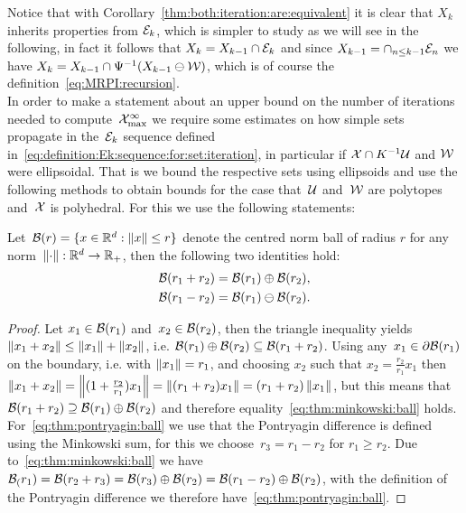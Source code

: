 %
\noindent Notice that with Corollary~\ref{thm:both:iteration:are:equivalent} it is clear that $X_k$ inherits properties from $\mathcal E_k$, which is simpler to study as we will see in the following, in fact it follows that $X_k = X_{k-1}\cap\mathcal E_k$ and since $X_{k-1} = \cap_{n\leq k-1}\mathcal E_n$ we have $X_k = X_{k-1}\cap\Psi^{-1}(X_{k-1}\ominus\mathcal W)$, which is of course the definition~\eqref{eq:MRPI:recursion}.
%
\\[1em]
%
\mysplit In order to make a statement about an upper bound on the number of iterations needed to compute~$\mathcal X_{\max}^\infty$ we require some estimates on how simple sets propagate in the~$\mathcal E_k$ sequence defined in~\eqref{eq:definition:Ek:sequence:for:set:iteration}, in particular if $\mathcal X\cap K^{-1}\mathcal U$ and $\mathcal W$ were ellipsoidal.
%
That is we bound the respective sets using ellipsoids and use the following methods to obtain bounds for the case that~$\mathcal U$ and~$\mathcal W$ are polytopes and~$\mathcal X$ is polyhedral.
%
For this we use the following statements:
%
\begin{cor}\label{thm:identities:norm:balls}
Let~$\mathcal B(r)=\{x\in\mathbb R^d:\left\|x\right\|\leq r\}$ denote the centred norm ball of radius $r$ for any norm~$\left\|\cdot\right\|:\mathbb R^d\rightarrow\mathbb R_+$, then the following two identities hold:
%
\begin{align}
	\mathcal B(r_1+r_2)&=\mathcal B(r_1)\oplus\mathcal B(r_2),\label{eq:thm:minkowski:ball}\\
	\mathcal B(r_1-r_2)&=\mathcal B(r_1)\ominus\mathcal B(r_2).\label{eq:thm:pontryagin:ball}
\end{align}
\end{cor}
%
\begin{proof}
%
Let $x_1\in\mathcal B(r_1)$ and~$x_2\in\mathcal B(r_2)$, then the triangle inequality yields~$\left\|x_1+x_2\right\|\leq\left\|x_1\right\|+\left\|x_2\right\|$, i.e. $\mathcal B(r_1)\oplus\mathcal B(r_2)\subseteq\mathcal B(r_1+r_2)$.
%
Using any~$x_1\in\partial\mathcal B(r_1)$ on the boundary, i.e. with $\left\|x_1\right\|=r_1$, and choosing $x_2$ such that $x_2=\frac{r_2}{r_1}x_1$ then $\left\|x_1+x_2\right\| = \left\|(1+\frac{r_2}{r_1})x_1\right\| = \left\|(r_1+r_2)x_1\right\| = (r_1+r_2)\left\|x_1\right\|$, but this means that $\mathcal B(r_1+r_2)\supseteq\mathcal B(r_1)\oplus\mathcal B(r_2)$ and therefore equality~\eqref{eq:thm:minkowski:ball} holds.
%
\\[1em]
%
For~\eqref{eq:thm:pontryagin:ball} we use that the Pontryagin difference is defined using the Minkowski sum, for this we choose~$r_3=r_1-r_2$ for $r_1\geq r_2$.
%
Due to~\eqref{eq:thm:minkowski:ball} we have~$\mathcal B_(r_1) = \mathcal B(r_2+r_3)=\mathcal B(r_3)\oplus\mathcal B(r_2)=\mathcal B(r_1-r_2)\oplus\mathcal B(r_2)$, with the definition of the Pontryagin difference we therefore have~\eqref{eq:thm:pontryagin:ball}.
%
\end{proof}
